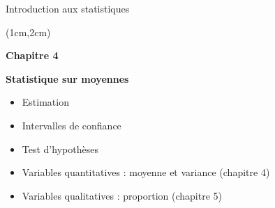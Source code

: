 \documentclass{beamer}
\begin{document}

\begin{frame}{Introduction aux statistiques}
\begin{textblock*}{\textwidth}(1cm,2cm)

\begin{center}{\bf \Large Chapitre 4} \end{center}
\begin{center}{\bf \Large Statistique sur moyennes} \end{center}
\vspace{0.5cm}
\begin{itemize}
\item Estimation  
\item Intervalles de confiance
\item Test d'hypothèses 
\end{itemize}
\vspace{0.5cm}
\begin{itemize}
\item Variables quantitatives : moyenne et variance (chapitre 4)
\item Variables qualitatives : proportion (chapitre 5)
\end{itemize}

 \end{textblock*}

\end{frame}


\end{document}
